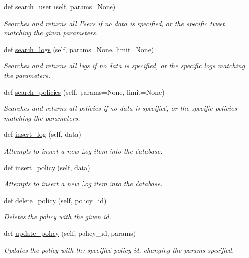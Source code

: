 \begin{DoxyCompactItemize}
def \hyperlink{classtwitter_1_1wrappers_1_1postgresql__wrapper_1_1PostgresAPI_a84fa6c90c91f88a68284fba6812b043f}{search\+\_\+user} (self, params=None)
\begin{DoxyCompactList}\small\item\em Searches and returns all Users if no data is specified, or the specific tweet matching the given parameters. \end{DoxyCompactList}\item 
def \hyperlink{classtwitter_1_1wrappers_1_1postgresql__wrapper_1_1PostgresAPI_a85bdfe473c1bd0bd29e11c059e7cb3dc}{search\+\_\+logs} (self, params=None, limit=None)
\begin{DoxyCompactList}\small\item\em Searches and returns all logs if no data is specified, or the specific logs matching the parameters. \end{DoxyCompactList}\item 
def \hyperlink{classtwitter_1_1wrappers_1_1postgresql__wrapper_1_1PostgresAPI_aeac23865a14e4f32e90cb7daa4a03e2b}{search\+\_\+policies} (self, params=None, limit=None)
\begin{DoxyCompactList}\small\item\em Searches and returns all policies if no data is specified, or the specific policies matching the parameters. \end{DoxyCompactList}\item 
def \hyperlink{classtwitter_1_1wrappers_1_1postgresql__wrapper_1_1PostgresAPI_ae0a6d7340ffc3d83829308940a296393}{insert\+\_\+log} (self, data)
\begin{DoxyCompactList}\small\item\em Attempts to insert a new Log item into the database. \end{DoxyCompactList}\item 
def \hyperlink{classtwitter_1_1wrappers_1_1postgresql__wrapper_1_1PostgresAPI_a97ea1442f99c7a75f996024dd3e3da8c}{insert\+\_\+policy} (self, data)
\begin{DoxyCompactList}\small\item\em Attempts to insert a new Log item into the database. \end{DoxyCompactList}\item 
def \hyperlink{classtwitter_1_1wrappers_1_1postgresql__wrapper_1_1PostgresAPI_a93b51196b75f21a7061a027a0b530bf0}{delete\+\_\+policy} (self, policy\+\_\+id)
\begin{DoxyCompactList}\small\item\em Deletes the policy with the given id. \end{DoxyCompactList}\item 
def \hyperlink{classtwitter_1_1wrappers_1_1postgresql__wrapper_1_1PostgresAPI_aa32ee622eb02190f09ec38919123bbb5}{update\+\_\+policy} (self, policy\+\_\+id, params)
\begin{DoxyCompactList}\small\item\em Updates the policy with the specified policy id, changing the params specified. \end{DoxyCompactList}\end{DoxyCompactItemize}
